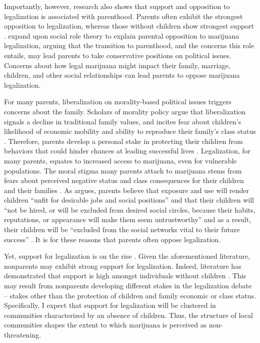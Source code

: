 Importantly, however, research also shows that support and opposition to legalization is associated with parenthood. Parents often exhibit the strongest opposition to legalization, whereas those without children show strongest support \citep{elder_and_greene_2019,mosher_and_akins_2019,newhart_and_dolphin_2018,caulkins_et_al_2012,rosenthal_and_kubby_1996}. \citet{elder_and_greene_2019} expand upon social role theory to explain parental opposition to marijuana legalization, arguing that the transition to parenthood, and the concerns this role entails, may lead parents to take conservative positions on political issues. Concerns about how legal marijuana might impact their family, marriage, children, and other social relationships can lead parents to oppose marijuana legalization. 


For many parents, liberalization on morality-based political issues triggers concerns about the family. Scholars of morality policy argue that liberalization signals a decline in traditional family values, and incites fear about children's likelihood of economic mobility and ability to reproduce their family's class status \citep{beisel_1997,gusfield_1963,eskridge_and_speadle_2006}. Therefore, parents develop a personal stake in protecting their children from behaviors that could hinder chances at leading successful lives \citep{beisel_1997,gusfield_1963}. Legalization, for many parents, equates to increased access to marijuana, even for vulnerable populations. The moral stigma many parents attach to marijuana stems from fears about perceived negative status and class consequences for their children and their families \citep{elder_and_greene_2019,lynskey_and_hall_2000,kandel_et_al_1986,lifrak_et_al_1997,fergusson_et_al_2002,kandel_2002,rosenthal_and_kubby_1996}. As \citet[5]{beisel_1997} argues, parents believe that exposure and use will render children ``unfit for desirable jobs and social positions'' and that their children will ``not be hired, or will be excluded from desired social circles, because their habits, reputations, or appearance will make them seem untrustworthy'' and as a result, their children will be ``excluded from the social networks vital to their future success'' \citep[199]{beisel_1997}. It is for these reasons that parents often oppose legalization. 


Yet, support for legalization is on the rise \citep{pew_2013,gallup_2013}. Given the aforementioned literature, nonparents may exhibit strong support for legalization. Indeed, literature has demonstrated that support is high amongst individuals without children \citep{newhart_and_dolphin_2018,caulkins_et_al_2012,rosenthal_and_kubby_1996}. This may result from nonparents developing different stakes in the legalization debate -- stakes other than the protection of children and family economic or class status. Specifically, I expect that support for legalization will be clustered in communities characterized by an absence of children. Thus, the structure of local communities shapes the extent to which marijuana is perceived as non-threatening.

